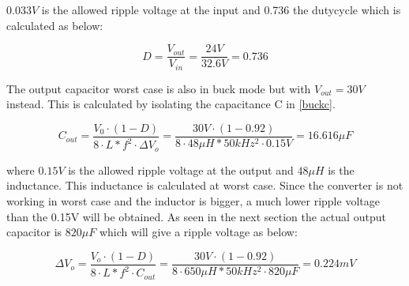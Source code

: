 $0.033V$ is the allowed ripple voltage at the input and 0.736 the dutycycle which is calculated as below:

\begin{equation} \label{buckduty}
D = \frac{V_{out}}{V_{in}} = \frac{24V}{32.6V} = 0.736
\end{equation} 


The output capacitor worst case is also in buck mode but with $V_{out}=30V$  instead. This is calculated by isolating the capacitance C in \ref{buckc}. 

\begin{equation} \label{buckc} 
C_{out} =\frac{V_{0}\cdot (1-D)}{8\cdot L*f^2\cdot \Delta V_o} = \frac{30V\cdot (1-0.92)}{8\cdot 48\mu H*50kHz^2\cdot 0.15V} = 16.616\mu F
\end{equation}

where $0.15V$ is the allowed ripple voltage at the output and $48\mu H$ is the inductance. This inductance is calculated at worst case. 
Since the converter is not working in worst case and the inductor is bigger, a much lower ripple voltage than the 0.15V will be obtained. As seen in the next section the actual output capacitor is $820\mu F$ which will give a ripple voltage as below:

\begin{equation} \label{buckc} 
\Delta V_o = \frac{V_{o}\cdot (1-D)}{8\cdot L*f^2\cdot C_{out}} = \frac{30V\cdot (1-0.92)}{8\cdot 650\mu H*50kHz^2\cdot 820\mu F} = 0.224mV
\end{equation}
   